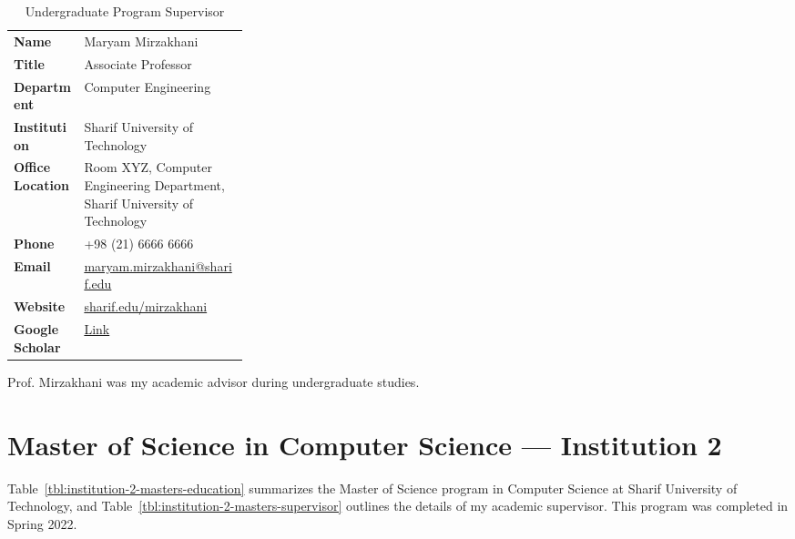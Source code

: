 \vspace{0.5cm}

\begin{table}[ht]
  \centering
  \begin{threeparttable}
    \renewcommand{\arraystretch}{1.3}
    \caption{Undergraduate Program Supervisor}
    \label{tbl:institution-1-bachelor-supervisor}
    \fontsize{9.5}{12}\selectfont
    \begin{tabularx}{0.65\textwidth}{
      >{\raggedright\arraybackslash}p{0.3\linewidth}
      >{\raggedright\arraybackslash}X
    }
    \toprule
    \cellcolor{myLightBlue}\textbf{Name} & Maryam Mirzakhani \\ 
    \cellcolor{myLightBlue}\textbf{Title} & Associate Professor \\ 
    \cellcolor{myLightBlue}\textbf{Department} & Computer Engineering \\ 
    \cellcolor{myLightBlue}\textbf{Institution} & Sharif University of Technology \\ 
    \cellcolor{myLightBlue}\textbf{Office Location} & Room XYZ, Computer Engineering Department, Sharif University of Technology \\ 
    \cellcolor{myLightBlue}\textbf{Phone} & +98 (21) 6666 6666 \\ 
    \cellcolor{myLightBlue}\textbf{Email} & \href{mailto:maryam.mirzakhani@sharif.edu}{maryam.mirzakhani@sharif.edu} \\ 
    \cellcolor{myLightBlue}\textbf{Website} & \href{https://sharif.edu/}{sharif.edu/\raisebox{0.5ex}{\texttildelow}mirzakhani} \\ 
    
    \cellcolor{myLightBlue}\textbf{Google Scholar} & \href{https://scholar.google.com/}{Link} \\
    \bottomrule
    \end{tabularx}
    \begin{tablenotes}
      \footnotesize
      \vspace{0.15cm}
      \item Prof. Mirzakhani was my academic advisor during undergraduate studies.
    \end{tablenotes}
  \end{threeparttable}
  \vspace{0.5cm}
\end{table}


\clearpage

\section{Master of Science in Computer Science — Institution 2}\label{sec:institution-2-masters}
\noindent
Table~\ref{tbl:institution-2-masters-education} summarizes the Master of Science program in Computer Science at Sharif University of Technology, and Table~\ref{tbl:institution-2-masters-supervisor} outlines the details of my academic supervisor. This program was completed in Spring 2022.

